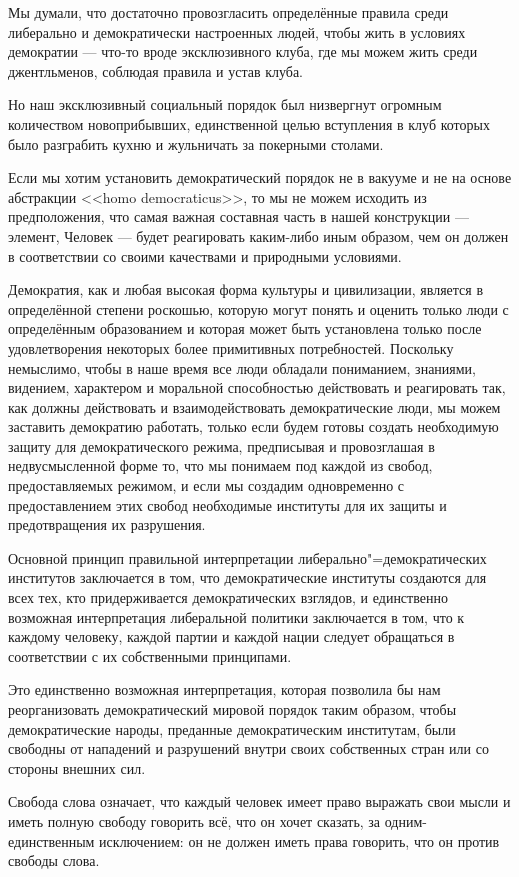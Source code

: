 Мы думали, что достаточно провозгласить определённые правила среди либерально и демократически настроенных людей, чтобы жить в условиях демократии — что-то вроде эксклюзивного клуба, где мы можем жить среди джентльменов, соблюдая правила и устав клуба.

Но наш эксклюзивный социальный порядок был низвергнут огромным количеством новоприбывших, единственной целью вступления в клуб которых было разграбить кухню и жульничать за покерными столами.

Если мы хотим установить демократический порядок не в вакууме и не на основе абстракции <<homo democraticus>>, то мы не можем исходить из предположения, что самая важная составная часть в нашей конструкции — элемент, Человек — будет реагировать каким-либо иным образом, чем он должен в соответствии со своими качествами и природными условиями.

Демократия, как и любая высокая форма культуры и цивилизации, является в определённой степени роскошью, которую могут понять и оценить только люди с определённым образованием и которая может быть установлена только после удовлетворения некоторых более примитивных потребностей. Поскольку немыслимо, чтобы в наше время все люди обладали пониманием, знаниями, видением, характером и моральной способностью действовать и реагировать так, как должны действовать и взаимодействовать демократические люди, мы можем заставить демократию работать, только если будем готовы создать необходимую защиту для демократического режима, предписывая и провозглашая в недвусмысленной форме то, что мы понимаем под каждой из свобод, предоставляемых режимом, и если мы создадим одновременно с предоставлением этих свобод необходимые институты для их защиты и предотвращения их разрушения.

Основной принцип правильной интерпретации либерально"=демократических институтов заключается в том, что демократические институты создаются для всех тех, кто придерживается демократических взглядов, и единственно возможная интерпретация либеральной политики заключается в том, что к каждому человеку, каждой партии и каждой нации следует обращаться в соответствии с их собственными принципами.

Это единственно возможная интерпретация, которая позволила бы нам реорганизовать демократический мировой порядок таким образом, чтобы демократические народы, преданные демократическим институтам, были свободны от нападений и разрушений внутри своих собственных стран или со стороны внешних сил.

Свобода слова означает, что каждый человек имеет право выражать свои мысли и иметь полную свободу говорить всё, что он хочет сказать, за одним-единственным исключением: он не должен иметь права говорить, что он против свободы слова.

